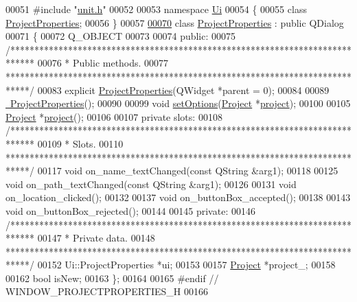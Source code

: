 \begin{DoxyCode}
00051 \textcolor{preprocessor}{#include "\hyperlink{unit_8h}{unit.h}"}
00052 
00053 \textcolor{keyword}{namespace }\hyperlink{namespace_ui}{Ui}
00054 \{
00055 \textcolor{keyword}{class }\hyperlink{class_project_properties}{ProjectProperties};
00056 \}
00057 
\hypertarget{projectproperties_8h_source_l00070}{}\hyperlink{class_project_properties}{00070} \textcolor{keyword}{class }\hyperlink{class_project_properties}{ProjectProperties} : \textcolor{keyword}{public} QDialog
00071 \{
00072   Q\_OBJECT
00073 
00074 \textcolor{keyword}{public}:
00075   \textcolor{comment}{/*****************************************************************************}
00076 \textcolor{comment}{  * Public methods.}
00077 \textcolor{comment}{  *****************************************************************************/}
00083   \textcolor{keyword}{explicit} \hyperlink{group___window_gad98f3b25db75d19fc7d99b65157fc3f0}{ProjectProperties}(QWidget *parent = 0);
00084 
00089   \hyperlink{group___window_ga8e0d4371b770784e85648926ded1f70a}{~ProjectProperties}();
00090 
00099   \textcolor{keywordtype}{void} \hyperlink{group___window_gaa9b9347f570a52e17e4debb4f03be625}{setOptions}(\hyperlink{class_project}{Project} *\hyperlink{group___window_ga241ef3f82071d6091e4addbda53a634c}{project});
00100 
00105   \hyperlink{class_project}{Project} *\hyperlink{group___window_ga241ef3f82071d6091e4addbda53a634c}{project}();
00106 
00107 \textcolor{keyword}{private} slots:
00108   \textcolor{comment}{/*****************************************************************************}
00109 \textcolor{comment}{  * Slots.}
00110 \textcolor{comment}{  *****************************************************************************/}
00117   \textcolor{keywordtype}{void} on\_name\_textChanged(\textcolor{keyword}{const} QString &arg1);
00118 
00125   \textcolor{keywordtype}{void} on\_path\_textChanged(\textcolor{keyword}{const} QString &arg1);
00126 
00131   \textcolor{keywordtype}{void} on\_location\_clicked();
00132 
00137   \textcolor{keywordtype}{void} on\_buttonBox\_accepted();
00138 
00143   \textcolor{keywordtype}{void} on\_buttonBox\_rejected();
00144 
00145 \textcolor{keyword}{private}:
00146   \textcolor{comment}{/*****************************************************************************}
00147 \textcolor{comment}{  * Private data.}
00148 \textcolor{comment}{  *****************************************************************************/}
00152   Ui::ProjectProperties *ui;
00153 
00157   \hyperlink{class_project}{Project} *project\_;
00158 
00162   \textcolor{keywordtype}{bool} isNew;
00163 \};
00164 
00165 \textcolor{preprocessor}{#endif  // WINDOW\_PROJECTPROPERTIES\_H}
00166 
\end{DoxyCode}
